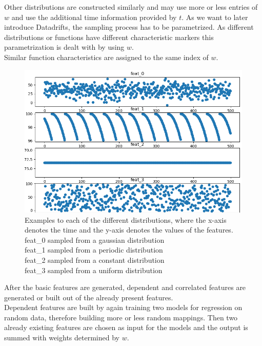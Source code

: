 \documentclass[12pt,a4paper,oneside,ngerman]{article}
\theoremstyle{plain}
\begin{document}
	Other distributions are constructed similarly and may use more or less entries of $w$ and use the additional time information provided by $t$. As we want to later introduce Datadrifts, the sampling process has to be parametrized. As different distributions or functions have different characteristic markers this parametrization is dealt with by using $w$.\\
	Similar function characteristics are assigned to the same index of $w$.\\
	\begin{figure}
		\centering
		\includegraphics[width=\textwidth]{Assets/example_distributions.png}
		\captionsetup{justification=centering}
		\caption{Examples to each of the different distributions, where the x-axis denotes the time and the y-axis denotes the values of the features.\\
		feat\_0 sampled from a gaussian distribution\\
		feat\_1 sampled from a periodic distribution\\
		feat\_2 sampled from a constant distribution\\
		feat\_3 sampled from a uniform distribution}
	\end{figure}
	
	After the basic features are generated, dependent and correlated features are generated or built out of the already present features.\\
	Dependent features are built by again training two models for regression on random data, therefore building more or less random mappings. Then two already existing features are chosen as input for the models and the output is summed with weights determined by $w$.\\
	
\end{document}
